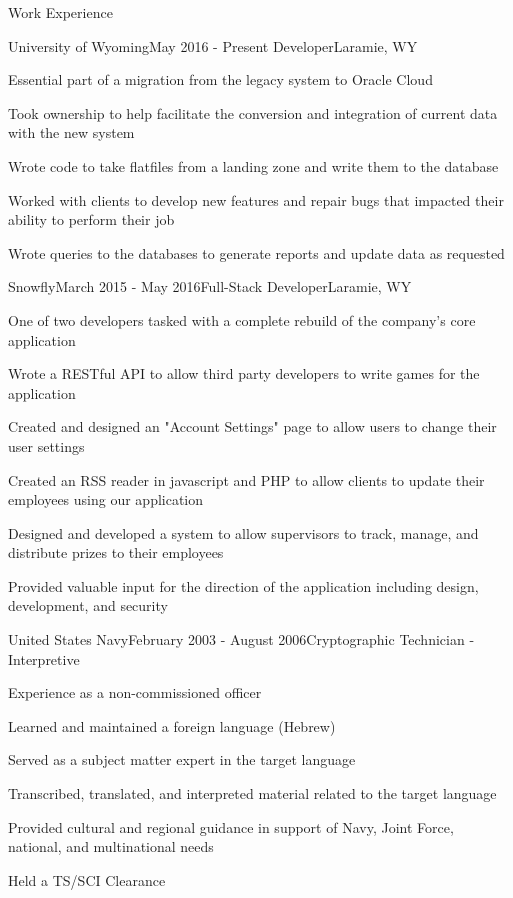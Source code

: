 \documentclass{resume} %
\begin{document}
\begin{rSection}{Work Experience}

\begin{rSubsection}{University of Wyoming}{May 2016 - Present} {Developer}{Laramie, WY}
\item Essential part of a migration from the legacy system to Oracle Cloud
\item Took ownership to help facilitate the conversion and integration of current data with the new system
\item Wrote code to take flatfiles from a landing zone and write them to the database
\item Worked with clients to develop new features and repair bugs that impacted their ability to perform their job
\item Wrote queries to the databases to generate reports and update data as requested
\end{rSubsection}

\begin{rSubsection}{Snowfly}{March 2015 - May 2016}{Full-Stack Developer}{Laramie, WY}
\item One of two developers tasked with a complete rebuild of the company's core application
\item Wrote a RESTful API to allow third party developers to write games for the application
\item Created and designed an "Account Settings" page to allow users to change their user settings
\item Created an RSS reader in javascript and PHP to allow clients to update their employees using our application
\item Designed and developed a system to allow supervisors to track, manage, and distribute prizes to their employees
\item Provided valuable input for the direction of the application including design, development, and security
\end{rSubsection}


\begin{rSubsection}{United States Navy}{February 2003 - August 2006}{Cryptographic Technician - Interpretive}{}
\item Experience as a non-commissioned officer
\item Learned and maintained a foreign language (Hebrew)
\item Served as a subject matter expert in the target language
\item Transcribed, translated, and interpreted material related to the target language
\item Provided cultural and regional guidance in support of Navy, Joint Force, national, and multinational needs
\item Held a TS/SCI Clearance
\end{rSubsection}

\end{rSection}
\end{document}
